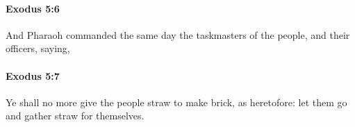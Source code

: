 		\paragraph{Exodus 5:6} %
			\label{EXODUS-5-6}

			And Pharaoh commanded the same day the taskmasters of the people, and their officers, saying,


		\paragraph{Exodus 5:7} %
			\label{EXODUS-5-7}

			Ye shall no more give the people straw to make brick, as heretofore: let them go and gather straw for themselves.



